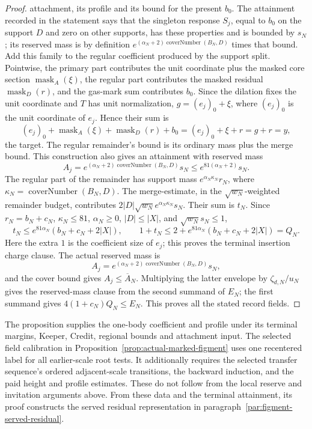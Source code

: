 \begin{proof}
attachment, its profile and its bound for the present $b_0$. The
attainment recorded in the statement says that the singleton response
$S_j$, equal to $b_0$ on the support $D$ and zero on other supports, has
these properties and is bounded by $s_N$; its reserved mass is by
definition $e^{(\alpha_N+2)\operatorname{coverNumber}(B_N,D)}$ times that
bound. Add this family to the regular
coefficient produced by the support split. Pointwise, the primary part
contributes the unit coordinate plus the masked core section
$\operatorname{mask}_A(\xi)$, the regular part contributes the masked
residual $\operatorname{mask}_D(r)$, and the gas-mark sum contributes
$b_0$. Since the dilation fixes the unit coordinate and $T$ has unit
normalization, $g=(e_j)_0+\xi$, where $(e_j)_0$ is the unit coordinate of
$e_j$. Hence their sum is
\[
 (e_j)_0+\operatorname{mask}_A(\xi)+\operatorname{mask}_D(r)+b_0
   =(e_j)_0+\xi+r=g+r=y,
\]
the target. The regular
remainder's bound is its ordinary mass plus the merge bound. This
construction also gives an attainment with reserved mass
\[
A_j=e^{(\alpha_N+2)\operatorname{coverNumber}(B_N,D)}s_N
       \leq e^{81(\alpha_N+2)}s_N.
\]
The regular part of the remainder has support mass
$e^{\alpha_N\kappa_N}r_N$, where
$\kappa_N=\operatorname{coverNumber}(B_N,D)$. The merge-estimate,
in the $\sqrt{w_N}$-weighted remainder budget, contributes
$2|D|\sqrt{w_N}e^{\alpha_N\kappa_N}s_N$. Their sum is $t_N$. Since
$r_N=b_N+c_N$, $\kappa_N\leq81$, $\alpha_N\geq0$, $|D|\leq|X|$, and
$\sqrt{w_N}s_N\leq1$,
\[
 t_N\leq e^{81\alpha_N}(b_N+c_N+2|X|),
 \qquad
 1+t_N\leq 2+e^{81\alpha_N}(b_N+c_N+2|X|)=Q_N.
\]
Here the extra $1$ is the coefficient size of $e_j$; this proves the
terminal insertion charge clause. The actual reserved mass is
\[
A_j=e^{(\alpha_N+2)\operatorname{coverNumber}(B_N,D)}s_N,
\]
and the cover bound gives $A_j\leq\overline A_N$. Multiplying the latter envelope by
$\zeta_{d,N}/u_N$ gives the reserved-mass clause from the second summand
of $E_N$; the first summand gives $4(1+c_N)Q_N\leq E_N$. This proves all
the stated record fields.
\end{proof}

The proposition supplies the one-body coefficient and profile under its
terminal margins, Keeper, Credit, regional bounds and attachment input.
The selected field calibration in Proposition~\ref{prop:actual-marked-figment}
uses one recentered label for all earlier-scale root tests. It additionally
requires the selected transfer sequence's ordered adjacent-scale transitions, the
backward induction, and the paid height and profile estimates. These do
not follow from the local reserve and invitation arguments above. From
these data and the terminal attainment, its proof constructs the served
residual representation in paragraph~\ref{par:figment-served-residual}.
